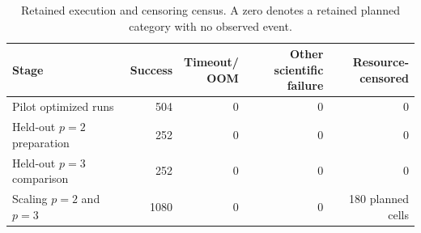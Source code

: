 
\begin{table}[ht]
\centering
\caption{Retained execution and censoring census. A zero denotes a retained planned category with no observed event.}
\label{tab:failure-census}
\small
\begin{tabularx}{\textwidth}{@{}Xrrrr@{}}
\toprule
Stage & Success & \shortstack{Timeout/\\OOM} & \shortstack{Other scientific\\failure} & \shortstack{Resource-\\censored} \\
\midrule
Pilot optimized runs & 504 & 0 & 0 & 0 \\
Held-out $p=2$ preparation & 252 & 0 & 0 & 0 \\
Held-out $p=3$ comparison & 252 & 0 & 0 & 0 \\
Scaling $p=2$ and $p=3$ & 1080 & 0 & 0 & 180 planned cells \\
\bottomrule
\end{tabularx}
\end{table}
